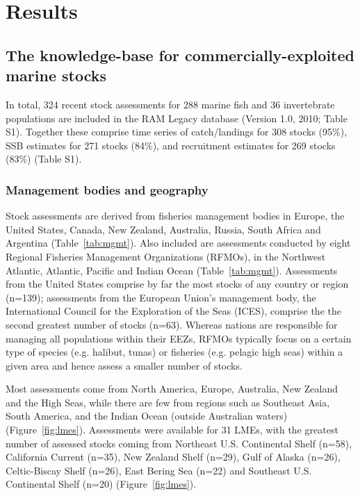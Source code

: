 \newpage
\section*{Results}
\subsection*{The knowledge-base for commercially-exploited marine stocks}
In total, 324 recent stock assessments for
288 marine fish and 36
invertebrate populations are included in the RAM Legacy database
(Version 1.0, 2010; Table S1). Together these comprise time series of
catch/landings for 308 stocks (95\%),
SSB estimates for 271 stocks (84\%), and recruitment estimates for
269 stocks (83\%) (Table S1).

\subsubsection*{Management bodies and geography}
Stock assessments are derived from fisheries management bodies in
Europe, the United States, Canada, New Zealand, Australia, Russia,
South Africa and Argentina (Table~\ref{tab:mgmt}). Also included are
assessments conducted by eight Regional Fisheries Management
Organizations (RFMOs), in the Northwest Atlantic, Atlantic, Pacific
and Indian Ocean (Table~\ref{tab:mgmt}). Assessments from the United
States comprise by far the most stocks of any country or region
(n=139); assessments from the European Union's
management body, the International Council for the Exploration of the
Seas (ICES), comprise the the second greatest number of stocks
(n=63).  Whereas nations are responsible for
managing all populations within their EEZs, RFMOs typically focus on a
certain type of species (e.g.  halibut, tunas) or fisheries (e.g.
pelagic high seas) within a given area and hence assess a smaller
number of stocks.

Most assessments come from North America, Europe, Australia, New
Zealand and the High Seas, while there are few from regions such as
Southeast Asia, South America, and the Indian Ocean (outside
Australian waters) (Figure~\ref{fig:lmes}). Assessments were available for 31 LMEs, with the greatest number of
assessed stocks coming from Northeast U.S. Continental Shelf (n=58),
California Current (n=35), New Zealand Shelf (n=29),
Gulf of Alaska (n=26), Celtic-Biscay Shelf (n=26), East Bering Sea (n=22)
and Southeast U.S. Continental Shelf (n=20) (Figure~\ref{fig:lmes}).

